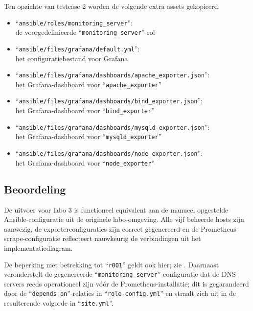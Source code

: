 Ten opzichte van testcase 2 worden de volgende extra assets gekopieerd:
\begin{itemize}
    \item ``\texttt{ansible/roles/monitoring\_server}'': \\de voorgedefinieerde ``\texttt{monitoring\_server}''-rol
    \item ``\texttt{ansible/files/grafana/default.yml}'': \\het configuratiebestand voor Grafana
    \item ``\texttt{ansible/files/grafana/dashboards/apache\_exporter.json}'': \\het Grafana-dashboard voor ``\texttt{apache\_exporter}''
    \item ``\texttt{ansible/files/grafana/dashboards/bind\_exporter.json}'': \\het Grafana-dashboard voor ``\texttt{bind\_exporter}''
    \item ``\texttt{ansible/files/grafana/dashboards/mysqld\_exporter.json}'': \\het Grafana-dashboard voor ``\texttt{mysqld\_exporter}''
    \item ``\texttt{ansible/files/grafana/dashboards/node\_exporter.json}'': \\het Grafana-dashboard voor ``\texttt{node\_exporter}''
\end{itemize}

\subsection{Beoordeling}%
\label{subsec:testcase3_beoordeling}

De uitvoer voor labo 3 is functioneel equivalent aan de manueel opgestelde Ansible-configuratie uit de originele labo-omgeving. Alle vijf beheerde hosts zijn aanwezig, de exporterconfiguraties zijn correct gegenereerd en de Prometheus scrape-configuratie reflecteert nauwkeurig de verbindingen uit het implementatiediagram.

De beperking met betrekking tot ``\texttt{r001}'' geldt ook hier; zie . Daarnaast veronderstelt de gegenereerde ``\texttt{monitoring\_server}''-configuratie dat de DNS-servers reeds operationeel zijn vóór de Prometheus-installatie; dit is gegarandeerd door de ``\texttt{depends\_on}''-relaties in ``\texttt{role-config.yml}'' en straalt zich uit in de resulterende volgorde in ``\texttt{site.yml}''.